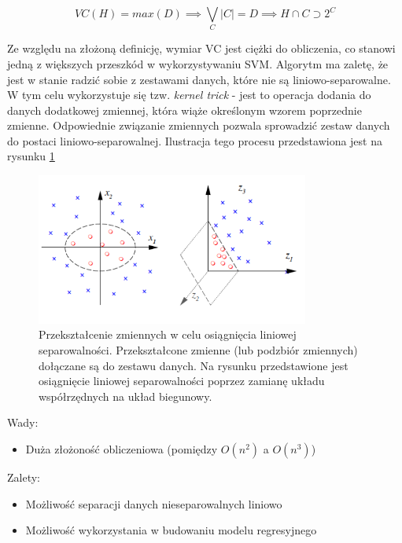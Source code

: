 \documentclass[12pt,a4paper,oneside]{report} %
\begin{document}
\begin{equation}
VC(H) = max(D) \implies \bigvee\limits_C \lvert C \rvert = D \implies H \cap C \supset 2^{C}
\end{equation}
\label{wymiarvc}

Ze względu na złożoną definicję, wymiar VC jest ciężki do obliczenia, co stanowi jedną z większych przeszkód w wykorzystywaniu SVM. Algorytm ma zaletę, że jest w stanie radzić sobie z zestawami danych, które nie są liniowo-separowalne. W tym celu wykorzystuje się tzw. \emph{kernel trick} - jest to operacja dodania do danych dodatkowej zmiennej, która wiąże określonym wzorem poprzednie zmienne. Odpowiednie związanie zmiennych pozwala sprowadzić zestaw danych do postaci liniowo-separowalnej. \cite{kernel-trick} Ilustracja tego procesu przedstawiona jest na rysunku \ref{kerneltrickpng}

\begin{figure}
\centering
\includegraphics[width=0.8\textwidth]{kernel-trick.png}
\caption[Przekształcenie zmiennych w celu osiągnięcia liniowej separowalności]{Przekształcenie zmiennych w celu osiągnięcia liniowej separowalności. Przekształcone zmienne (lub podzbiór zmiennych) dołączane są do zestawu danych. Na rysunku przedstawione jest osiągnięcie liniowej separowalności poprzez zamianę układu współrzędnych na układ biegunowy.\label{kerneltrickpng}}
\end{figure}\par
\vspace{0.5cm}
Wady:\par
\begin{itemize}
\item Duża złożoność obliczeniowa (pomiędzy $O(n^2)$ a $O(n^3)$)
\end{itemize}\par
Zalety:\par
\begin{itemize}
\item Możliwość separacji danych nieseparowalnych liniowo
\item Możliwość wykorzystania w budowaniu modelu regresyjnego
\end{itemize}\par
\end{document}
